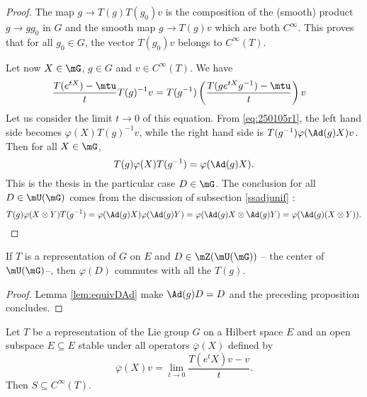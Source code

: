 \begin{proof}
The map $g\to T(g)T(g_0)v$ is the composition of the (smooth) product $g\to gg_0$ in $G$ and the smooth map $g\to T(g)v$ which are both $ C^{\infty}$. This proves that for all $g_0\in G$, the vector $T(g_0)v$ belongs to $C^{\infty}(T)$.

Let now $X\in\mG$, $g\in G$ and $v\in C^{\infty}(T)$. We have
\begin{equation}
\begin{split}
  \frac{T(e^{tX})-\mtu}{t}T(g)^{-1}v&=T(g^{-1})\left( \frac{T(ge^{tX}g^{-1})-\mtu}{t} \right)v
\end{split}
\end{equation}
Let us consider the limit $t\to 0$ of this equation. From \eqref{eq:250105r1}, the left hand side becomes $\varphi(X)T(g)^{-1}v$, while the right hand side is $T(g^{-1})\varphi(\Ad(g)X)v$. Then for all $X\in\mG$,
\begin{equation}
  T(g)\varphi(X)T(g^{-1})=\varphi(\Ad(g)X).
\end{equation}
This is the thesis in the particular case $D\in\mG$. The conclusion for all $D\in\mU(\mG)$ comes from the discussion of subsection \ref{ssadjunif} :
\begin{equation}
   T(g)\varphi(X\otimes Y)T(g^{-1})=\varphi(\Ad(g)X)\varphi(\Ad(g)Y)
			=\varphi(\Ad(g)X\otimes\Ad(g)Y)
			=\varphi(\Ad(g)(X\otimes Y)).
\end{equation}
\end{proof}

\begin{corollary}
If $T$ is a representation of $G$ on $E$ and $D\in\mZ(\mU(\mG))$ -- the center of $\mU(\mG)$--, then $\varphi(D)$ commutes with all the $T(g)$.
\end{corollary} 

\begin{proof}
Lemma \ref{lem:equivDAd} make $\Ad(g)D=D$ and the preceding proposition concludes. 
\end{proof}

\begin{proposition}
Let $T$ be a representation of the Lie group $G$ on a Hilbert space $E$ and an open subspace $E\subseteq E$ stable under all operators $\overline{ \varphi }(X)$ defined by
\begin{equation} \label{eq:ovlphilim}
\overline{ \varphi }(X)v=\lim_{t\to 0}\frac{ T(e^tX)v-v }{ t }.
\end{equation}
Then $S\subseteq  C^{\infty}(T)$.
\end{proposition}

